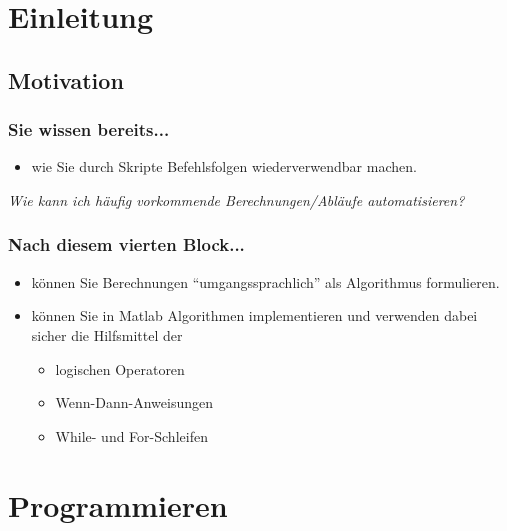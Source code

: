 



\setcounter{mchapter}{4}
\setcounter{mexercise}{0}


  

  \section{Einleitung}

  \subsection{Motivation}
  \begin{frame}
      \frametitle{Sie wissen bereits...}
      \begin{itemize}
          \item wie Sie durch Skripte Befehlsfolgen wiederverwendbar machen.
      \end{itemize}

      \textit{Wie kann ich häufig vorkommende Berechnungen/Abläufe automatisieren?}
  \end{frame}

  \begin{frame}
      \frametitle{Nach diesem vierten Block...}
      \begin{itemize}
          \item können Sie Berechnungen ``umgangssprachlich'' als Algorithmus formulieren.
          \item können Sie in Matlab Algorithmen implementieren und verwenden dabei sicher die Hilfsmittel der
          \begin{itemize}
              \item logischen Operatoren
              \item Wenn-Dann-Anweisungen
              \item While- und For-Schleifen
          \end{itemize}
      \end{itemize}
  \end{frame}

  \section{Programmieren}

